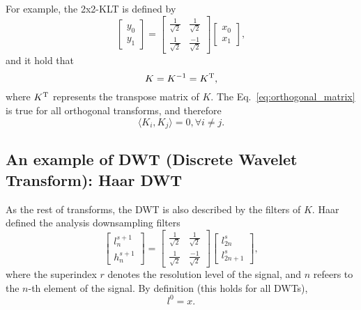 For example, the 2x2-KLT is defined by
\begin{equation}
  \begin{bmatrix}
    y_0 \\
    y_1
  \end{bmatrix}
  = 
  \begin{bmatrix} \frac{1}{\sqrt{2}} & \frac{1}{\sqrt{2}} \\ \frac{1}{\sqrt{2}} & \frac{-1}{\sqrt{2}} \end{bmatrix}
  \begin{bmatrix}
    x_0 \\
    x_1
  \end{bmatrix},
  \label{eq:KLT_transform}
\end{equation}
and it hold that
\begin{equation}
  K=K^{-1}=K^{\text T},
  \label{eq:orthogonal_matrix}
\end{equation}
where $K^{\text T}$ represents the transpose matrix of $K$. The
Eq.~\ref{eq:orthogonal_matrix} is true for all orthogonal transforms,
and therefore
\begin{equation}
  \langle K_i, K_j\rangle = 0, \forall i\neq j.
\end{equation}

\subsection{An example of DWT (Discrete Wavelet Transform): Haar DWT}

As the rest of transforms, the DWT is also described by the filters of
$K$. Haar defined the analysis downsampling filters
\begin{equation}
  \begin{bmatrix}
    l^{s+1}_n \\
    h^{s+1}_n
  \end{bmatrix}
  = 
  \begin{bmatrix} \frac{1}{\sqrt{2}} & \frac{1}{\sqrt{2}} \\ \frac{1}{\sqrt{2}} & \frac{-1}{\sqrt{2}} \end{bmatrix}
  \begin{bmatrix}
    l^s_{2n} \\
    l^s_{2n+1}
  \end{bmatrix},
  \label{eq:Haar_transform}
\end{equation}
where the superindex $r$ denotes the resolution level of the signal, and $n$ refeers to the $n$-th element of the signal. By definition (this holds for all DWTs),
\begin{equation}
  l^0=x.
\end{equation}

